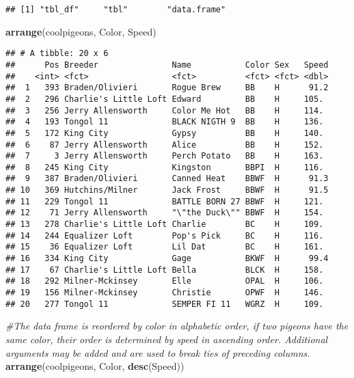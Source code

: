 \documentclass[]{article}
\newenvironment{Shaded}{\begin{snugshade}}{\end{snugshade}}
\newcommand{\KeywordTok}[1]{\textcolor[rgb]{0.13,0.29,0.53}{\textbf{#1}}}
\newcommand{\CommentTok}[1]{\textcolor[rgb]{0.56,0.35,0.01}{\textit{#1}}}
\newcommand{\NormalTok}[1]{#1}
\begin{document}
\begin{verbatim}
## [1] "tbl_df"     "tbl"        "data.frame"
\end{verbatim}

\begin{Shaded}
\begin{Highlighting}[]
\KeywordTok{arrange}\NormalTok{(coolpigeons, Color, Speed) }
\end{Highlighting}
\end{Shaded}

\begin{verbatim}
## # A tibble: 20 x 6
##      Pos Breeder               Name           Color Sex   Speed
##    <int> <fct>                 <fct>          <fct> <fct> <dbl>
##  1   393 Braden/Olivieri       Rogue Brew     BB    H      91.2
##  2   296 Charlie's Little Loft Edward         BB    H     105. 
##  3   256 Jerry Allensworth     Color Me Hot   BB    H     114. 
##  4   193 Tongol 11             BLACK NIGTH 9  BB    H     136. 
##  5   172 King City             Gypsy          BB    H     140. 
##  6    87 Jerry Allensworth     Alice          BB    H     152. 
##  7     3 Jerry Allensworth     Perch Potato   BB    H     163. 
##  8   245 King City             Kingston       BBPI  H     116. 
##  9   387 Braden/Olivieri       Canned Heat    BBWF  H      91.3
## 10   369 Hutchins/Milner       Jack Frost     BBWF  H      91.5
## 11   229 Tongol 11             BATTLE BORN 27 BBWF  H     121. 
## 12    71 Jerry Allensworth     "\"the Duck\"" BBWF  H     154. 
## 13   278 Charlie's Little Loft Charlie        BC    H     109. 
## 14   244 Equalizer Loft        Pop's Pick     BC    H     116. 
## 15    36 Equalizer Loft        Lil Dat        BC    H     161. 
## 16   334 King City             Gage           BKWF  H      99.4
## 17    67 Charlie's Little Loft Bella          BLCK  H     158. 
## 18   292 Milner-Mckinsey       Elle           OPAL  H     106. 
## 19   156 Milner-Mckinsey       Christie       OPWF  H     146. 
## 20   277 Tongol 11             SEMPER FI 11   WGRZ  H     109.
\end{verbatim}

\begin{Shaded}
\begin{Highlighting}[]
\CommentTok{#The data frame is reordered by color in alphabetic order, if two pigeons have the same color, their order is determined by speed in ascending order. Additional arguments may be added and are used to break ties of preceding columns.}
\KeywordTok{arrange}\NormalTok{(coolpigeons, Color, }\KeywordTok{desc}\NormalTok{(Speed))}
\end{Highlighting}
\end{Shaded}
\end{document}
